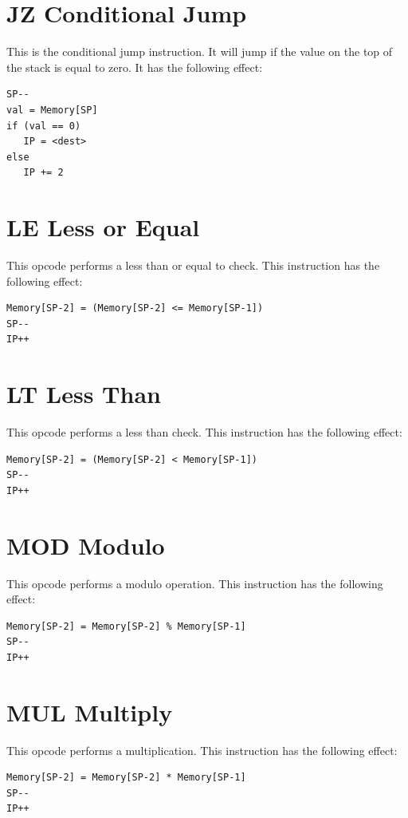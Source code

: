 \documentclass[11pt,a4paper,oneside]{book}
\begin{document}
\pagebreak
\section[JZ]{\texorpdfstring{JZ \hfill Conditional Jump}{JZ -- Conditional Jump}}
This is the conditional jump instruction. It will jump if the value on the top of the stack is equal to zero. It has the following effect:
\begin{verbatim}
SP--
val = Memory[SP]
if (val == 0)
   IP = <dest>
else
   IP += 2
\end{verbatim}

\pagebreak
\section[LE]{\texorpdfstring{LE \hfill Less or Equal}{LE -- Less or Equal}}
This opcode performs a less than or equal to check. This instruction has the following effect:
\begin{verbatim}
Memory[SP-2] = (Memory[SP-2] <= Memory[SP-1])
SP--
IP++
\end{verbatim}

\pagebreak
\section[LT]{\texorpdfstring{LT \hfill Less Than}{LT -- Less Than}}
This opcode performs a less than check. This instruction has the following effect:
\begin{verbatim}
Memory[SP-2] = (Memory[SP-2] < Memory[SP-1])
SP--
IP++
\end{verbatim}

\pagebreak
\section[MOD]{\texorpdfstring{MOD \hfill Modulo}{MOD -- Modulo}}
This opcode performs a modulo operation. This instruction has the following effect:
\begin{verbatim}
Memory[SP-2] = Memory[SP-2] % Memory[SP-1]
SP--
IP++
\end{verbatim}

\pagebreak
\section[MUL]{\texorpdfstring{MUL \hfill Multiply}{MUL -- Multiply}}
This opcode performs a multiplication. This instruction has the following effect:
\begin{verbatim}
Memory[SP-2] = Memory[SP-2] * Memory[SP-1]
SP--
IP++
\end{verbatim}
\end{document}
